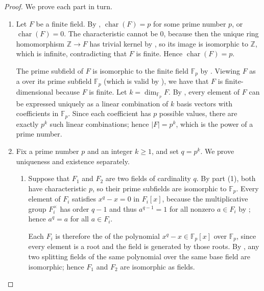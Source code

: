 \begin{proof}
    We prove each part in turn.

    \begin{enumerate}
        \item Let $F$ be a finite field. By , $\operatorname{char}(F) = p$ for some prime number $p$, or $\operatorname{char}(F) = 0$. The characteristic cannot be $0$, because then the unique ring homomorphism $\mathbb{Z} \to F$ has trivial kernel by , so its image is isomorphic to $\mathbb{Z}$, which is infinite, contradicting that $F$ is finite. Hence $\operatorname{char}(F) = p$.

            The prime subfield of $F$ is isomorphic to the finite field $\mathbb{F}_p$ by . Viewing $F$ as a  over its prime subfield $\mathbb{F}_p$ (which is valid by ), we have that $F$ is finite-dimensional because $F$ is finite. Let $k = \dim_{\mathbb{F}_p} F$. By , every element of $F$ can be expressed uniquely as a linear combination of $k$ basis vectors with coefficients in $\mathbb{F}_p$. Since each coefficient has $p$ possible values, there are exactly $p^k$ such linear combinations; hence $|F| = p^k$, which is the power of a prime number.

        \item Fix a prime number $p$ and an integer $k \geq 1$, and set $q = p^k$. We prove uniqueness and existence separately.

        \begin{enumerate}
            \item Suppose that $F_1$ and $F_2$ are two fields of cardinality $q$. By part (1), both have characteristic $p$, so their prime subfields are isomorphic to $\mathbb{F}_p$. Every element of $F_i$ satisfies $x^q - x = 0$ in $F_i[x]$, because the multiplicative group $F_i^\times$ has order $q-1$ and thus $a^{q-1} = 1$ for all nonzero $a \in F_i$ by ; hence $a^q = a$ for all $a \in F_i$.

            Each $F_i$ is therefore the  of the polynomial $x^q - x \in \mathbb{F}_p[x]$ over $\mathbb{F}_p$, since every element is a root and the field is generated by those roots. By , any two splitting fields of the same polynomial over the same base field are isomorphic; hence $F_1$ and $F_2$ are isomorphic as fields.


\end{enumerate}
\end{enumerate}
\end{proof}
